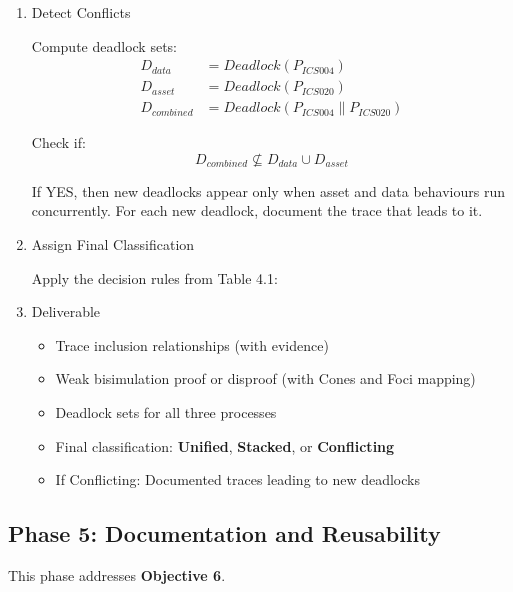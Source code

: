 \begin{enumerate}
  If \(\phi\) exists and all proof obligations are satisfied, then
  \(P_{ICS004} \approx P_{ICS020}\) (weak bisimilar).
\item
  Detect Conflicts

  Compute deadlock sets: \[
  \begin{aligned}
  D_{data} &= Deadlock(P_{ICS004}) \\
  D_{asset} &= Deadlock(P_{ICS020}) \\
  D_{combined} &= Deadlock(P_{ICS004} \parallel P_{ICS020})
  \end{aligned}
  \]

  Check if: \[
  D_{combined} \not\subseteq D_{data} \cup D_{asset}
  \]

  If YES, then new deadlocks appear only when asset and data behaviours
  run concurrently. For each new deadlock, document the trace that leads
  to it.
\item
  Assign Final Classification

  Apply the decision rules from Table 4.1:
\item
  Deliverable

  \begin{itemize}
      \item Trace inclusion relationships (with evidence)
      \item Weak bisimulation proof or disproof (with Cones and Foci mapping)
      \item Deadlock sets for all three processes
      \item Final classification: \textbf{Unified}, \textbf{Stacked}, or \textbf{Conflicting}
      \item If Conflicting: Documented traces leading to new deadlocks
  \end{itemize}
\end{enumerate}

\subsection{Phase 5: Documentation and
Reusability}\label{phase-5-documentation-and-reusability}

This phase addresses \textbf{Objective 6}.

